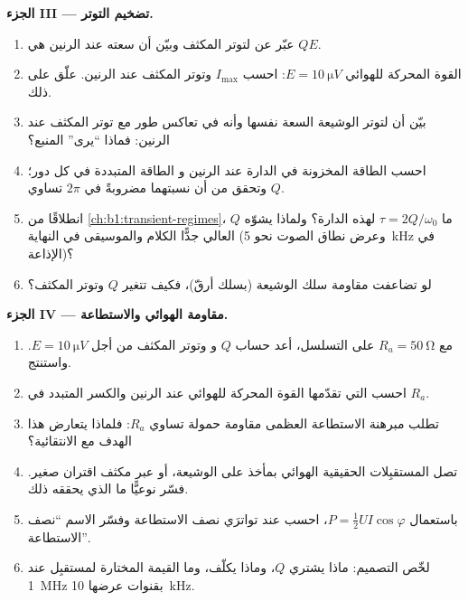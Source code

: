 \begin{problem}
\medskip
\noindent\textbf{الجزء III --- تضخيم التوتر.}
\begin{enumerate}[resume]
  \item عبّر عن  لتوتر المكثف وبيّن
        أن سعته عند الرنين هي $QE$.
  \item القوة المحركة للهوائي $E = \qty{10}{\micro V}$: احسب $I_{\max}$
        وتوتر المكثف عند الرنين. علّق على ذلك.
  \item بيّن أن لتوتر الوشيعة السعة نفسها وأنه في
        تعاكس طور مع توتر المكثف عند الرنين: فماذا
        ``يرى'' المنبع؟
  \item احسب الطاقة المخزونة في الدارة عند الرنين و
        الطاقة المتبددة في كل دور؛ وتحقق من أن نسبتهما مضروبةً في
        $2\pi$ تساوي $Q$.
  \item انطلاقًا من \cref{ch:b1:transient-regimes}، ما 
        $\tau = 2Q/\omega_0$ لهذه الدارة؟ ولماذا يشوّه $Q$ العالي جدًّا
        الكلام والموسيقى في النهاية (وعرض نطاق الصوت
        نحو \qty{5}{kHz} في الإذاعة)؟
  \item لو تضاعفت مقاومة سلك الوشيعة (بسلك أرقّ)، فكيف تتغير
        $Q$  وتوتر المكثف؟
\end{enumerate}

\medskip
\noindent\textbf{الجزء IV --- مقاومة الهوائي والاستطاعة.}
\begin{enumerate}[resume]
  \item مع $R_a = \qty{50}{\ohm}$ على التسلسل، أعد حساب $Q$ و
         وتوتر المكثف من أجل $E = \qty{10}{\micro V}$.
        واستنتج.
  \item احسب  التي تقدّمها القوة المحركة للهوائي عند
        الرنين والكسر المتبدد في $R_a$.
  \item تطلب مبرهنة الاستطاعة العظمى مقاومة حمولة تساوي
        $R_a$: فلماذا يتعارض هذا الهدف مع الانتقائية؟
  \item تصل المستقبِلات الحقيقية الهوائي بمأخذ على الوشيعة، أو
        عبر مكثف اقتران صغير. فسّر نوعيًّا ما الذي
        يحققه ذلك.
  \item باستعمال $P = \tfrac12 UI\cos\varphi$، احسب  عند
        تواترَي نصف الاستطاعة وفسّر الاسم
        ``نصف الاستطاعة''.
  \item لخّص التصميم: ماذا يشتري $Q$، وماذا يكلّف، وما
        القيمة المختارة لمستقبِل عند \qty{1}{MHz} بقنوات عرضها
        \qty{10}{kHz}.
\end{enumerate}
\end{problem}
